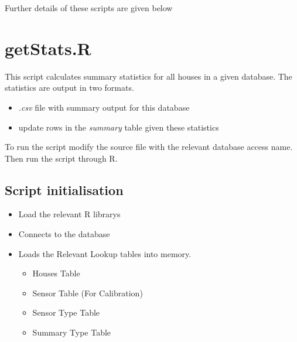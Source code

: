 \documentclass[10pt,a4paper]{article}\usepackage{graphicx, color}
\begin{document}
Further details of these scripts are given below

\section{getStats.R}




This script calculates summary statistics for all houses in a given database.
The statistics are output in two formats.
\begin{itemize}
  \item \emph{.csv} file with summary output for this database
  \item update rows in the \emph{summary} table given these statistics
\end{itemize}

To run the script modify the source file with the relevant database access
name. Then run the script through R. 


\subsection{Script initialisation}

\begin{itemize}
\item Load the relevant R librarys
\item Connects to the database
\item Loads the Relevant Lookup tables into memory.
  \begin{itemize}
  \item Houses Table
  \item Sensor Table (For Calibration)
  \item Sensor Type Table
  \item Summary Type Table
  \end{itemize}
\end{itemize}
\end{document}
